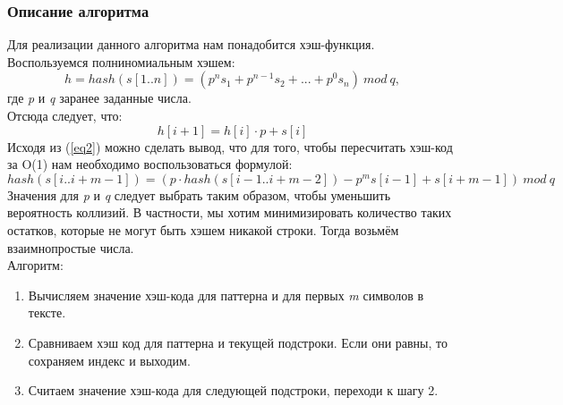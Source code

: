 \documentclass[12pt]{article}
\begin{document}
\subsubsection{Описание алгоритма}
Для реализации данного алгоритма нам понадобится хэш-функция. Воспользуемся полниномиальным хэшем:
\begin{equation}
h = hash(s[1 .. n]) = (p^{n}s_{1} + p^{n - 1}s_{2} + ... + p^{0}s_{n}) \: mod \: q,
\end{equation} где \textit{p} и \textit{q} заранее заданные числа.\\
Отсюда следует, что:\\
\begin{equation} \label{eq2}
h[i + 1] = h[i] \cdot p + s[i]
\end{equation}
Исходя из (\ref{eq2}) можно сделать вывод, что для того, чтобы пересчитать хэш-код за O(1) нам необходимо воспользоваться формулой: \\
\begin{equation}
hash(s[i .. i + m - 1]) = (p \cdot hash(s[i - 1 .. i + m - 2]) - p^{m}s[i - 1] + s[i + m - 1]) \: mod \: q
\end{equation}
Значения для \textit{p} и \textit{q} следует выбрать таким образом, чтобы уменьшить вероятность коллизий. В частности, мы хотим минимизировать количество таких остатков, которые не могут быть хэшем никакой строки. Тогда возьмём взаимнопростые числа.\\
Алгоритм:
\begin{enumerate}
	\item Вычисляем значение хэш-кода для паттерна и для первых \textit{m} символов в тексте.
	\item Сравниваем хэш код для паттерна и текущей подстроки. Если они равны, то сохраняем индекс и выходим.
	\item Считаем значение хэш-кода для следующей подстроки, переходи к шагу 2.
\end{enumerate}
\end{document}
